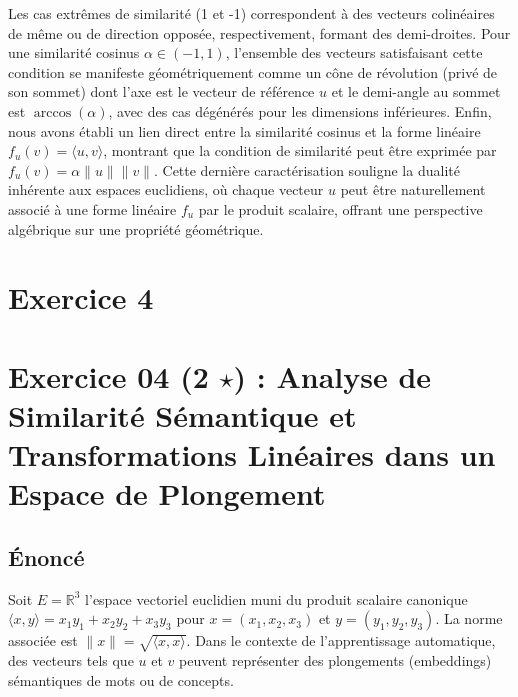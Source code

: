 \documentclass[11pt,a4paper]{report}
\begin{document}
Les cas extrêmes de similarité (1 et -1) correspondent à des vecteurs
colinéaires de même ou de direction opposée, respectivement, formant des
demi-droites. Pour une similarité cosinus \(\alpha \in (-1, 1)\),
l'ensemble des vecteurs satisfaisant cette condition se manifeste
géométriquement comme un cône de révolution (privé de son sommet) dont
l'axe est le vecteur de référence \(u\) et le demi-angle au sommet est
\(\arccos(\alpha)\), avec des cas dégénérés pour les dimensions
inférieures. Enfin, nous avons établi un lien direct entre la similarité
cosinus et la forme linéaire \(f_u(v) = \langle u, v \rangle\), montrant
que la condition de similarité peut être exprimée par
\(f_u(v) = \alpha \|u\| \|v\|\). Cette dernière caractérisation souligne
la dualité inhérente aux espaces euclidiens, où chaque vecteur \(u\)
peut être naturellement associé à une forme linéaire \(f_u\) par le
produit scalaire, offrant une perspective algébrique sur une propriété
géométrique.


\section*{Exercice 4}
\hypertarget{exercice-04-2-star-analyse-de-similarituxe9-suxe9mantique-et-transformations-linuxe9aires-dans-un-espace-de-plongement}{%
\section{\texorpdfstring{Exercice 04 (2 \(\star\)) : Analyse de
Similarité Sémantique et Transformations Linéaires dans un Espace de
Plongement}{Exercice 04 (2 \textbackslash star) : Analyse de Similarité Sémantique et Transformations Linéaires dans un Espace de Plongement}}\label{exercice-04-2-star-analyse-de-similarituxe9-suxe9mantique-et-transformations-linuxe9aires-dans-un-espace-de-plongement}}

\hypertarget{uxe9noncuxe9}{%
\subsection{Énoncé}\label{uxe9noncuxe9}}

Soit \(E = \mathbb{R}^3\) l'espace vectoriel euclidien muni du produit
scalaire canonique \(\langle x, y \rangle = x_1y_1 + x_2y_2 + x_3y_3\)
pour \(x=(x_1, x_2, x_3)\) et \(y=(y_1, y_2, y_3)\). La norme associée
est \(\|x\| = \sqrt{\langle x, x \rangle}\). Dans le contexte de
l'apprentissage automatique, des vecteurs tels que \(u\) et \(v\)
peuvent représenter des plongements (embeddings) sémantiques de mots ou
de concepts.
\end{document}
